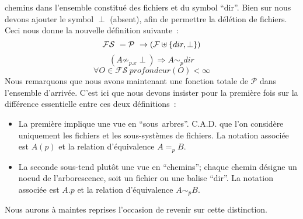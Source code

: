 \documentclass[11pt]{report}
\newcommand{\fs}{\ensuremath{\mathcal{FS}}}
\newcommand{\path}{\ensuremath{\mathcal{P}}}
\begin{document}
chemins dans l'ensemble constitu\'e des fichiers et du symbol ``dir''.
Bien sur nous devons ajouter le symbol $\perp$ (absent), afin de permettre la 
d\'el\'etion de fichiers. Ceci nous donne la nouvelle d\'efinition suivante~:
\begin{equation}
\fs\ = \path\ \rightarrow ( \mathcal{F} \uplus \{dir, \perp \})\\
\end{equation}
\begin{equation} \label{eq:parent}
(A \not\sim_{p.x} \perp) \Rightarrow A \sim_{p} dir
\end{equation}
\begin{equation}
\forall O \in \fs\ \mathit{profondeur}(O) < \infty
\end{equation}
Nous remarquons que nous avons maintenant une fonction totale de $\mathcal{P}$
dans l'ensemble d'arriv\'ee.
C'est ici que nous devons insister pour la premi\`ere fois sur la diff\'erence 
essentielle entre ces deux d\'efinitions~: 
\begin{itemize}
\item La premi\`ere implique une vue en ``sous~arbres''. 
C.A.D. que l'on consid\`ere uniquement les fichiers et les sous-syst\`emes de 
fichiers. La notation associ\'ee est $A(p)$ et la relation d'\'equivalence
 $A =_{p} B$.
\item La seconde sous-tend plut\^ot une vue en ``chemins''; chaque
chemin d\'esigne un noeud de l'arborescence, soit un fichier ou une balise 
``dir''. 
La notation associ\'ee est $A.p$ et la relation d'\'equivalence $A \sim_{p} B$.
\end{itemize}
Nous aurons \`a maintes reprises l'occasion de revenir sur cette distinction.
\end{document}
